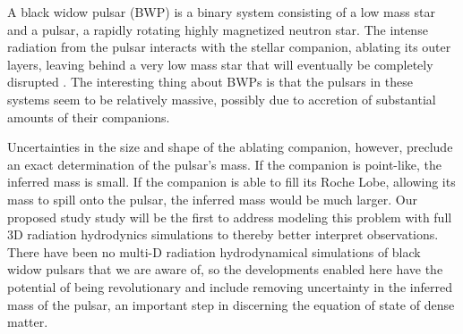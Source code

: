 A black widow pulsar (BWP) is a binary system consisting of a low mass
star and a pulsar, a rapidly rotating highly magnetized neutron star.  
The intense radiation from the pulsar interacts with the stellar companion,
ablating its outer layers, leaving behind a very low mass star that 
will eventually be completely disrupted 
\cite [See][and references therein]{bednareksitarek2013}. The interesting 
thing about 
BWPs is that the pulsars in these systems seem to be relatively massive, 
possibly due to accretion of substantial amounts of their companions. 

Uncertainties in the size and shape of the ablating companion, however, 
preclude an exact determination of the pulsar's mass. If the companion is 
point-like, the inferred mass is small.  If the companion is able to fill 
its Roche Lobe, allowing its mass to spill onto the pulsar, the inferred 
mass would be much larger. Our proposed study study will be the first 
to address modeling this problem with full 3D radiation hydrodynics
simulations to thereby better interpret observations. There have been 
no multi-D radiation hydrodynamical simulations 
of black widow pulsars that we are aware of, so the developments enabled 
here have the potential of being revolutionary and include removing
uncertainty in the inferred mass of the pulsar, an important step
in discerning the equation of state of dense matter.


